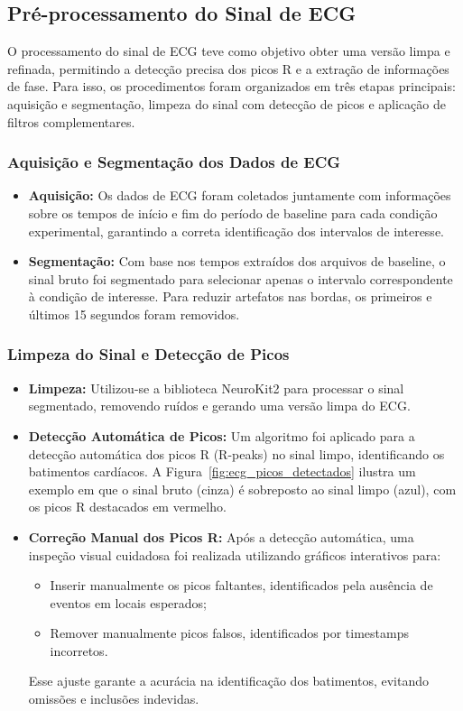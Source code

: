 \subsection{Pré-processamento do Sinal de ECG}
\label{subsec:preprocess_ecg}

O processamento do sinal de ECG teve como objetivo obter uma versão limpa e refinada, permitindo a detecção precisa dos picos R e a extração de informações de fase. Para isso, os procedimentos foram organizados em três etapas principais: aquisição e segmentação, limpeza do sinal com detecção de picos e aplicação de filtros complementares.

\subsubsection{Aquisição e Segmentação dos Dados de ECG}
\begin{itemize}
    \item \textbf{Aquisição:} Os dados de ECG foram coletados juntamente com informações sobre os tempos de início e fim do período de baseline para cada condição experimental, garantindo a correta identificação dos intervalos de interesse.
    \item \textbf{Segmentação:} Com base nos tempos extraídos dos arquivos de baseline, o sinal bruto foi segmentado para selecionar apenas o intervalo correspondente à condição de interesse. Para reduzir artefatos nas bordas, os primeiros e últimos 15 segundos foram removidos.
\end{itemize}

\subsubsection{Limpeza do Sinal e Detecção de Picos}
\begin{itemize}
    \item \textbf{Limpeza:} Utilizou-se a biblioteca NeuroKit2 para processar o sinal segmentado, removendo ruídos e gerando uma versão limpa do ECG.
    \item \textbf{Detecção Automática de Picos:} Um algoritmo foi aplicado para a detecção automática dos picos R (R-peaks) no sinal limpo, identificando os batimentos cardíacos. A Figura~\ref{fig:ecg_picos_detectados} ilustra um exemplo em que o sinal bruto (cinza) é sobreposto ao sinal limpo (azul), com os picos R destacados em vermelho.
    \item \textbf{Correção Manual dos Picos R:} Após a detecção automática, uma inspeção visual cuidadosa foi realizada utilizando gráficos interativos para:
    \begin{itemize}
        \item Inserir manualmente os picos faltantes, identificados pela ausência de eventos em locais esperados;
        \item Remover manualmente picos falsos, identificados por timestamps incorretos.
    \end{itemize}
    Esse ajuste garante a acurácia na identificação dos batimentos, evitando omissões e inclusões indevidas.
\end{itemize}


